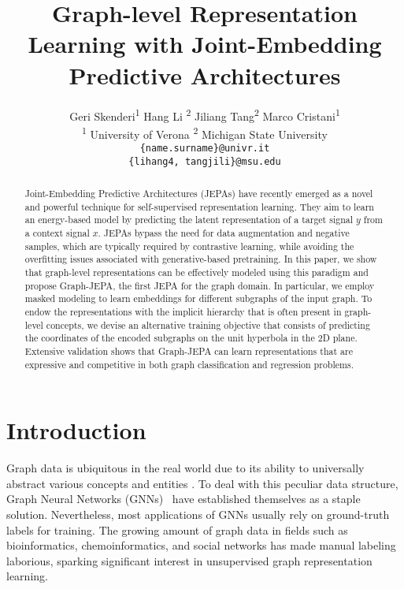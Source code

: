 \documentclass{article} \usepackage{iclr2024_conference,times}
\title{Graph-level Representation Learning with Joint-Embedding Predictive Architectures}
\author{Geri Skenderi\textsuperscript{1} \quad Hang Li \textsuperscript{2} \quad Jiliang Tang\textsuperscript{2} \quad Marco Cristani\textsuperscript{1} \\
\textsuperscript{1} University of Verona \quad \textsuperscript{2} Michigan State University
\\
\texttt{\{name.surname\}@univr.it} \\
\texttt{\{lihang4, tangjili\}@msu.edu}
}
\begin{document}
\maketitle

\begin{abstract}
   Joint-Embedding Predictive Architectures (JEPAs) have recently emerged as a novel and powerful technique for self-supervised representation learning. They aim to learn an energy-based model by predicting the latent representation of a target signal $y$ from a context signal $x$. JEPAs bypass the need for data augmentation and negative samples, which are typically required by contrastive learning, while avoiding the overfitting issues associated with generative-based pretraining. In this paper, we show that graph-level representations can be effectively modeled using this paradigm and propose Graph-JEPA, the first JEPA for the graph domain. In particular, we employ masked modeling to learn embeddings for different subgraphs of the input graph. To endow the representations with the implicit hierarchy that is often present in graph-level concepts, we devise an alternative training objective that consists of predicting the coordinates of the encoded subgraphs on the unit hyperbola in the 2D plane. Extensive validation shows that Graph-JEPA can learn representations that are expressive and competitive in both graph classification and regression problems.
\end{abstract}

\section{Introduction}

Graph data is ubiquitous in the real world due to its ability to universally abstract various concepts and entities \citep{ma_tang_2021,velivckovic2023everything}. To deal with this peculiar data structure, Graph Neural Networks (GNNs)~\citep{scarselli2008graph,kipf2016semi,gilmer2017neural,velivckovic2017graph} have established themselves as a staple solution. Nevertheless, most applications of GNNs usually rely on ground-truth labels for training. The growing amount of graph data in fields such as bioinformatics, chemoinformatics, and social networks has made manual labeling laborious, sparking significant interest in unsupervised graph representation learning.
\end{document}
